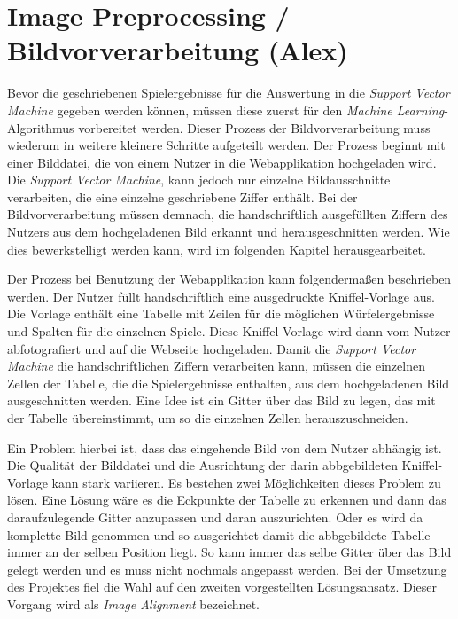 \section{Image Preprocessing / Bildvorverarbeitung (Alex)}
Bevor die geschriebenen Spielergebnisse für die Auswertung in die \textit{Support Vector Machine} gegeben werden können, müssen diese zuerst
für den \textit{Machine Learning}-Algorithmus vorbereitet werden. Dieser Prozess der Bildvorverarbeitung muss wiederum in weitere kleinere
Schritte aufgeteilt werden. Der Prozess beginnt mit einer Bilddatei, die von einem Nutzer in die Webapplikation hochgeladen wird. 
Die \textit{Support Vector Machine}, kann jedoch nur einzelne Bildausschnitte verarbeiten, die eine einzelne geschriebene Ziffer enthält.
Bei der Bildvorverarbeitung müssen demnach, die handschriftlich ausgefüllten Ziffern des Nutzers aus dem hochgeladenen Bild erkannt und
herausgeschnitten werden. Wie dies bewerkstelligt werden kann, wird im folgenden Kapitel herausgearbeitet.

Der Prozess bei Benutzung der Webapplikation kann folgendermaßen beschrieben werden. Der Nutzer füllt handschriftlich eine ausgedruckte Kniffel-Vorlage aus.
Die Vorlage enthält eine Tabelle mit Zeilen für die möglichen Würfelergebnisse und Spalten für die einzelnen Spiele. Diese Kniffel-Vorlage 
wird dann vom Nutzer abfotografiert und auf die Webseite hochgeladen. Damit die \textit{Support Vector Machine} die handschriftlichen Ziffern verarbeiten kann,
müssen die einzelnen Zellen der Tabelle, die die Spielergebnisse enthalten, aus dem hochgeladenen Bild ausgeschnitten werden. Eine Idee ist
ein Gitter über das Bild zu legen, das mit der Tabelle übereinstimmt, um so die einzelnen Zellen herauszuschneiden.

Ein Problem hierbei ist, dass das eingehende Bild von dem Nutzer abhängig ist. Die Qualität der Bilddatei und die Ausrichtung der darin abbgebildeten 
Kniffel-Vorlage kann stark variieren. Es bestehen zwei Möglichkeiten dieses Problem zu lösen. Eine Lösung wäre es die Eckpunkte der Tabelle zu erkennen und 
dann das daraufzulegende Gitter anzupassen und daran auszurichten. Oder es wird da komplette Bild genommen und so ausgerichtet damit die abbgebildete Tabelle
immer an der selben Position liegt. So kann immer das selbe Gitter über das Bild gelegt werden und es muss nicht nochmals angepasst werden.
Bei der Umsetzung des Projektes fiel die Wahl auf den zweiten vorgestellten Lösungsansatz. Dieser Vorgang wird als \textit{Image Alignment} bezeichnet.

